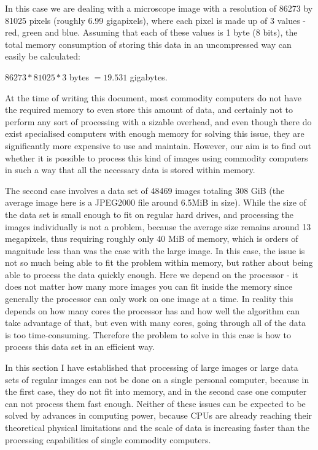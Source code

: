 \documentclass [12pt,a4paper]{report}
\begin{document}
In this case we are dealing with a microscope image with a resolution of 86273 by 81025 pixels (roughly 6.99 gigapixels), where each pixel is made up of 3 values - red, green and blue. Assuming that each of these values is 1 byte (8 bits), the total memory consumption of storing this data in an uncompressed way can easily be calculated:

\begin{center}
$ 86273 * 81025 * 3 $ bytes $ = 19.531 $ gigabytes.
\end{center}

At the time of writing this document, most commodity computers do not have the required memory to even store this amount of data, and certainly not to perform any sort of processing with a sizable overhead, and even though there do exist specialised computers with enough memory for solving this issue, they are significantly more expensive to use and maintain. However, our aim is to find out whether it is possible  to process this kind of images using commodity computers in such a way that all the necessary data is stored within memory.

The second case involves a data set of 48469 images totaling 308 GiB (the average image here is a JPEG2000 file around 6.5MiB in size). While the size of the data set is small enough to fit on regular hard drives, and processing the images individually is not a problem, because the average size remains around 13 megapixels, thus requiring roughly only 40 MiB of memory, which is orders of magnitude less than was the case with the large image. In this case, the issue is not so much being able to fit the problem within memory, but rather about being able to process the data quickly enough. Here we depend on the processor - it does not matter how many more images you can fit inside the memory since generally the processor can only work on one image at a time. In reality this depends on how many cores the processor has and how well the algorithm can take advantage of that, but even with many cores, going through all of the data is too time-consuming. Therefore the problem to solve in this case is how to process this data set in an efficient way.

In this section I have established that processing of large images or large data sets of regular images can not be done on a single personal computer, because in the first case, they do not fit into memory, and in the second case one computer can not process them fast enough. Neither of these issues can be expected to be solved by advances in computing power, because CPUs are already reaching their theoretical physical limitations  and the scale of data is increasing faster than the processing capabilities of single commodity computers. 
\end{document}
